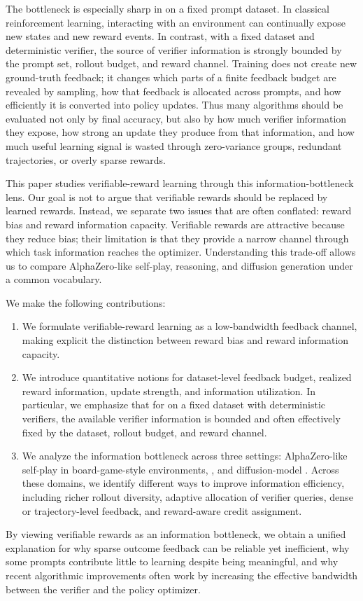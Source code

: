 The bottleneck is especially sharp in \llm{} \rlvr{} on a fixed prompt dataset. In classical reinforcement learning, interacting with an environment can continually expose new states and new reward events. In contrast, with a fixed dataset and deterministic verifier, the source of verifier information is strongly bounded by the prompt set, rollout budget, and reward channel. Training does not create new ground-truth feedback; it changes which parts of a finite feedback budget are revealed by sampling, how that feedback is allocated across prompts, and how efficiently it is converted into policy updates. Thus many \rlvr{} algorithms should be evaluated not only by final accuracy, but also by how much verifier information they expose, how strong an update they produce from that information, and how much useful learning signal is wasted through zero-variance groups, redundant trajectories, or overly sparse rewards.

This paper studies verifiable-reward learning through this information-bottleneck lens. Our goal is not to argue that verifiable rewards should be replaced by learned rewards. Instead, we separate two issues that are often conflated: reward bias and reward information capacity. Verifiable rewards are attractive because they reduce bias; their limitation is that they provide a narrow channel through which task information reaches the optimizer. Understanding this trade-off allows us to compare AlphaZero-like self-play, \llm{} reasoning, and diffusion generation under a common vocabulary.

We make the following contributions:
\begin{enumerate}
  \item We formulate verifiable-reward learning as a low-bandwidth feedback channel, making explicit the distinction between reward bias and reward information capacity.
  \item We introduce quantitative notions for dataset-level feedback budget, realized reward information, update strength, and information utilization. In particular, we emphasize that for \llm{} \rlvr{} on a fixed dataset with deterministic verifiers, the available verifier information is bounded and often effectively fixed by the dataset, rollout budget, and reward channel.
  \item We analyze the information bottleneck across three settings: AlphaZero-like self-play in board-game-style environments, \llm{} \rlvr{}, and diffusion-model \rlvr{}. Across these domains, we identify different ways to improve information efficiency, including richer rollout diversity, adaptive allocation of verifier queries, dense or trajectory-level feedback, and reward-aware credit assignment.
\end{enumerate}

By viewing verifiable rewards as an information bottleneck, we obtain a unified explanation for why sparse outcome feedback can be reliable yet inefficient, why some prompts contribute little to learning despite being meaningful, and why recent algorithmic improvements often work by increasing the effective bandwidth between the verifier and the policy optimizer.
